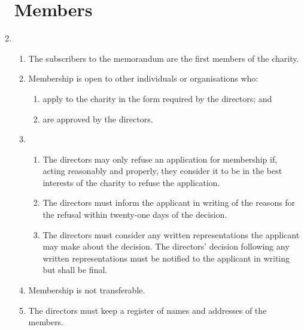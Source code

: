 \documentclass{article}
\begin{document}
\begin{enumerate}[label=\arabic*]
    \section{Members}
    \item \begin{enumerate}[label=(\arabic*)]
        \item The subscribers to the memorandum are the first members of
        the charity.
        \item Membership is open to other individuals or organisations who:
        \begin{enumerate}[label=(\alph*)]
            \item apply to the charity in the form required by the
            directors; and
            \item are approved by the directors.
        \end{enumerate}
        \item \begin{enumerate}[label=(\alph*)]
            \item The directors may only refuse an application for
            membership if, acting reasonably and properly, they
            consider it to be in the best interests of the charity to
            refuse the application.
            \item The directors must inform the applicant in writing of
            the reasons for the refusal within twenty-one days of
            the decision.
            \item The directors must consider any written representations
            the applicant may make about the decision. The directors'
            decision following any written representations must be
            notified to the applicant in writing but shall be final.
        \end{enumerate}
        \item Membership is not transferable.
        \item The directors must keep a register of names and addresses of
        the members.
    \end{enumerate}
    

\end{enumerate}
\end{document}
